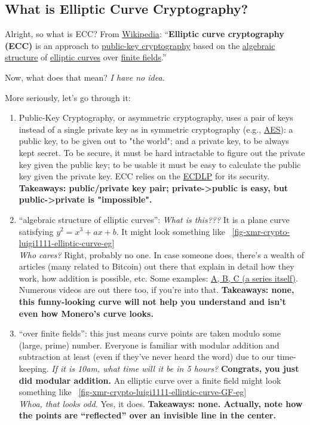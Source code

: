 \subsection{What is Elliptic Curve Cryptography?}
Alright, so what is ECC? From \href{https://en.wikipedia.org/wiki/Elliptic_curve_cryptography}{Wikipedia}: ``\textbf{Elliptic curve cryptography (ECC)} is an approach to \href{https://en.wikipedia.org/wiki/Public-key_cryptography}{public-key cryptography} based on the \href{https://en.wikipedia.org/wiki/Algebraic_structure}{algebraic structure} of \href{https://en.wikipedia.org/wiki/Elliptic_curve}{elliptic curves} over \href{https://en.wikipedia.org/wiki/Finite_field}{finite fields}.''

Now, what does that mean? \emph{I have no idea.}

More seriously, let's go through it:
	\begin{enumerate}
		\item Public-Key Cryptography, or asymmetric cryptography, uses a pair of keys instead of a single private key as in symmetric cryptography (e.g., \href{https://en.wikipedia.org/wiki/Advanced_Encryption_Standard}{AES}): a public key, to be given out to "the world"; and a private key, to be always kept secret. To be secure, it must be hard intractable to figure out the private key given the public key; to be usable it must be easy to calculate the public key given the private key. ECC relies on the \href{https://en.wikipedia.org/wiki/Discrete_logarithm}{ECDLP} for its security. \textbf{Takeaways: public/private key pair; private->public is easy, but public->private is "impossible".}
		\item ``algebraic structure of elliptic curves'': \emph{What is this???} It is a plane curve satisfying \(y^2=x^3+ax+b\). It might look something like \figurename~\ref{fig-xmr-crypto-luigi1111-elliptic-curve-eg}\\
			\emph{Who cares?} Right, probably no one. In case someone does, there's a wealth of articles (many related to Bitcoin) out there that explain in detail how they work, how addition is possible, etc. Some examples: \href{http://andrea.corbellini.name/2015/05/17/elliptic-curve-cryptography-a-gentle-introduction/}{A, B, C (a series itself)}. Numerous videos are out there too, if you're into that. \textbf{Takeaways: none, this funny-looking curve will not help you understand and isn't even how Monero's curve looks.}
		\item ``over finite fields'': this just means curve points are taken modulo some (large, prime) number. Everyone is familiar with modular addition and subtraction at least (even if they've never heard the word) due to our time-keeping. \emph{If it is 10am, what time will it be in 5 hours?} \textbf{Congrats, you just did modular addition.} An elliptic curve over a finite field might look something like \figurename~\ref{fig-xmr-crypto-luigi1111-elliptic-curve-GF-eg}\\
			\textit{Whoa, that looks odd.} Yes, it does. \textbf{Takeaways: none. Actually, note how the points are ``reflected'' over an invisible line in the center.}
	\end{enumerate}
